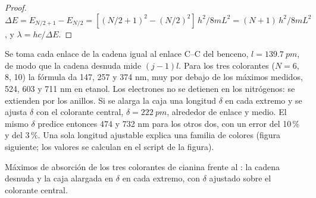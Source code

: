 \begin{proof}
$\Delta E = E_{N/2+1} - E_{N/2} = [(N/2+1)^2 - (N/2)^2]\,h^2/8mL^2 =
(N+1)\,h^2/8mL^2$, y $\lambda = hc/\Delta E$.
\end{proof}

\begin{example}\label{ex:b3:quantum-model-systems:dyes}
Se toma cada enlace de la cadena igual al enlace C--C del benceno,
$l = \qty{139.7}{pm}$, de modo que la cadena desnuda mide $(j - 1)l$. Para los
tres colorantes ($N = 6$, 8, 10) la fórmula da 147, 257 y 374 nm, muy
por debajo de los máximos medidos, 524, 603 y 711 nm en etanol. Los electrones
no se detienen en los nitrógenos: se extienden por los anillos. Si se alarga la
caja una longitud $\delta$ en cada extremo y se ajusta $\delta$ con el colorante central,
$\delta = \qty{222}{pm}$, alrededor de enlace y medio. El mismo $\delta$
predice entonces 474 y 732 nm para los otros dos, con un error del 10\,\% y del 3\,\%. Una sola
longitud ajustable explica una familia de colores (figura siguiente; los valores se
calculan en el script de la figura).
\end{example}

\begin{omfigure}

{\small Máximos de absorción de los tres colorantes de cianina frente al
: la cadena desnuda y la caja alargada en $\delta$ en
cada extremo, con $\delta$ ajustado sobre el colorante central.}
\end{omfigure}


